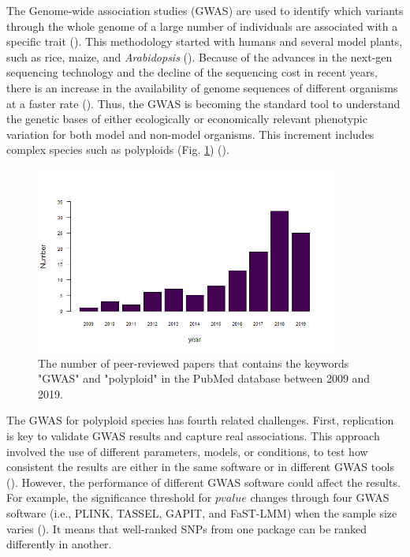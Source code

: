 \documentclass{article}
\begin{document}
The Genome-wide association studies (GWAS) are used to identify which variants through the whole genome of a large number of individuals are associated with a specific trait (\cite{cantor2010prioritizing,begum2012comprehensive}). This methodology started with humans and several model plants, such as rice, maize, and \emph{Arabidopsis} (\cite{lauc2010genomics,tian2011genome,cao2011whole,korte2013advantages,han2013sequencing}). Because of the advances in the next-gen sequencing technology and the decline of the sequencing cost in recent years, there is an increase in the availability of genome sequences of different organisms at a faster rate (\cite{ekblom2011applications,ellegren2014genome}). Thus, the GWAS is becoming the standard tool to understand the genetic bases of either ecologically or economically relevant phenotypic variation for both model and non-model organisms. This increment includes complex species such as polyploids (Fig. \ref{GWASpolyploids}) (\cite{ekblom2011applications,santure2018wild}).


\begin{figure}[H]
\begin{centering}
\includegraphics[width=10cm]{images/GWASpolyploids_Pubmed.png} 
\par\end{centering}
\centering{}\caption{The number of peer-reviewed papers that contains the keywords "GWAS" and "polyploid" in the PubMed database between 2009 and 2019.\label{GWASpolyploids}}
\end{figure}

The GWAS for polyploid species has fourth related challenges. First, replication is key to validate GWAS results and capture real associations. This approach involved the use of different parameters, models, or conditions, to test how consistent the results are either in the same software or in different GWAS tools (\cite{De2014, Pearson2008}). However, the performance of different GWAS software could affect the results. For example, the significance threshold for $pvalue$ changes through four GWAS software (i.e., PLINK, TASSEL, GAPIT, and FaST-LMM) when the sample size varies (\cite{Yan2019}). It means that well-ranked SNPs from one package can be ranked differently in another.
\end{document}
